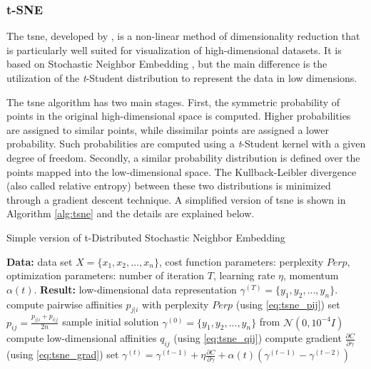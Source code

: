 \subsubsection{t-SNE}

The \acf{tsne}, developed by \cite{tsne}, is a non-linear method of dimensionality reduction that is particularly well suited for visualization of high-dimensional datasets. It is based on Stochastic Neighbor Embedding \citep{sne}, but the main difference is the utilization of the \textit{t}-Student distribution to represent the data in low dimensions.

The \acs{tsne} algorithm has two main stages. First, the symmetric probability of points in the original high-dimensional space is computed. Higher probabilities are assigned to similar points, while dissimilar points are assigned a lower probability. Such probabilities are computed using a \textit{t}-Student kernel with a given degree of freedom. Secondly, a similar probability distribution is defined over the points mapped into the low-dimensional space. The Kullback-Leibler divergence (also called relative entropy) between these two distributions is minimized through a gradient descent technique. A simplified version of \acs{tsne} is shown in Algorithm \ref{alg:tsne} and the details are explained below.

\begin{algorithm}[t]
\caption{Simple version of t-Distributed Stochastic Neighbor Embedding}
\label{alg:tsne}
\begin{algorithmic}
    \State \textbf{Data:} data set $X = \{x_1, x_2, ..., x_n\}$,
    \State cost function parameters: perplexity $Perp$,
    \State optimization parameters: number of iteration $T$, learning rate $\eta$, momentum $\alpha(t)$.
    \State \textbf{Result:} low-dimensional data representation $\gamma^{(T)} = \{y_1, y_2, ..., y_n\}$.
    \Begin 
        \State compute pairwise affinities $p_{j|i}$ with perplexity $Perp$ (using \autoref{eq:tsne_pij})
        \State set $p_{ij} = \frac{p_{j|i} + p_{i|j}}{2n}$
        \State sample initial solution $\gamma^{(0)} = \{y_1, y_2, ..., y_n\}$ from $\mathcal{N}(0, 10^{-4}I)$
        \Begin
            \State compute low-dimensional affinities $q_{ij}$ (using \autoref{eq:tsne_qij})
            \State compute gradient $\frac{\partial C}{\partial \gamma}$ (using \autoref{eq:tsne_grad})
            \State set $\gamma^{(t)} = \gamma^{(t-1)} + \eta \frac{\partial C}{\partial \gamma} + \alpha(t)(\gamma^{(t-1)} - \gamma^{(t-2)})$
        \End
    \End
\end{algorithmic}
\end{algorithm}

